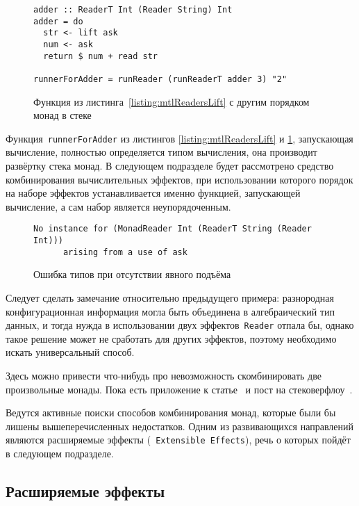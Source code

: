 \begin{figure}[t]
\begin{lstlisting}
adder :: ReaderT Int (Reader String) Int
adder = do
  str <- lift ask
  num <- ask
  return $ num + read str

runnerForAdder = runReader (runReaderT adder 3) "2"
\end{lstlisting}
\caption{Функция из листинга~\ref{listing:mtlReadersLift} с другим порядком монад в стеке}
\label{listing:mtlDifferentReadersLift}
\end{figure}

Функция~\lstinline{runnerForAdder} из листингов \ref{listing:mtlReadersLift} и \ref{listing:mtlDifferentReadersLift}, запускающая вычисление, полностью определяется типом вычисления, она производит развёртку стека монад. В следующем подразделе будет рассмотрено средство комбинирования вычислительных эффектов, при использовании которого порядок на наборе эффектов устанавливается именно функцией, запускающей вычисление, а сам набор является неупорядоченным.     

\begin{figure}[t]
\begin{lstlisting}
No instance for (MonadReader Int (ReaderT String (Reader Int)))
      arising from a use of ask
\end{lstlisting}
\caption{Ошибка типов при отсутствии явного подъёма}
\label{listing:mtlCompileError}
\end{figure}

Следует сделать замечание относительно предыдущего примера: разнородная конфигурационная информация могла быть объединена в алгебраический тип данных, и тогда нужда в использовании двух эффектов~\lstinline{Reader} отпала бы, однако такое решение может не сработать для других эффектов, поэтому необходимо искать универсальный способ. 

Здесь можно привести что-нибудь про невозможность скомбинировать две произвольные монады. Пока есть приложение к статье~\autocite{ComposingMonads} и пост на стековерфлоу~\autocite{SOMonadsComposition}.

Ведутся активные поиски способов комбинирования монад, которые были бы лишены вышеперечисленных недостатков. Одним из развивающихся направлений являются расширяемые эффекты (~\lstinline{Extensible Effects}), речь о которых пойдёт в следующем подразделе.

\subsection{Расширяемые эффекты}

